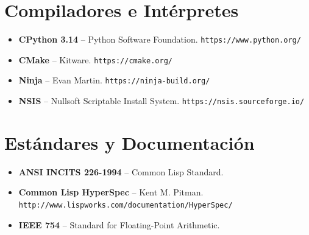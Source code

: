 \section*{Compiladores e Intérpretes}

\begin{itemize}
\item \textbf{CPython 3.14} -- Python Software Foundation.
  \texttt{https://www.python.org/}
\item \textbf{CMake} -- Kitware. \texttt{https://cmake.org/}
\item \textbf{Ninja} -- Evan Martin. \texttt{https://ninja-build.org/}
\item \textbf{NSIS} -- Nullsoft Scriptable Install System.
  \texttt{https://nsis.sourceforge.io/}
\end{itemize}

\section*{Estándares y Documentación}

\begin{itemize}
\item \textbf{ANSI INCITS 226-1994} -- Common Lisp Standard.
\item \textbf{Common Lisp HyperSpec} -- Kent M. Pitman.
  \texttt{http://www.lispworks.com/documentation/HyperSpec/}
\item \textbf{IEEE 754} -- Standard for Floating-Point Arithmetic.
\end{itemize}

